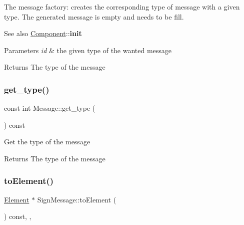 The message factory\+: creates the corresponding type of message with a given type. The generated message is empty and needs to be fill. \begin{DoxySeeAlso}{See also}
\mbox{\hyperlink{classComponent}{Component}}\+:\+:{\bfseries init}
\end{DoxySeeAlso}

\begin{DoxyParams}{Parameters}
{\em id} & the given type of the wanted message \\
\hline
\end{DoxyParams}
\begin{DoxyReturn}{Returns}
The type of the message 
\end{DoxyReturn}
\mbox{\label{classMessage_a2a576dcffd45c4574fcdf2897ec26086}} 
\subsubsection{\texorpdfstring{get\+\_\+type()}{get\_type()}}
{\footnotesize\ttfamily const int Message\+::get\+\_\+type (\begin{DoxyParamCaption}{ }\end{DoxyParamCaption}) const\hspace{0.3cm}{\ttfamily [inherited]}}

Get the type of the message

\begin{DoxyReturn}{Returns}
The type of the message 
\end{DoxyReturn}
\mbox{\label{classSignMessage_aee897c4bf78df966b8cca95e589566e4}} 
\subsubsection{\texorpdfstring{to\+Element()}{toElement()}}
{\footnotesize\ttfamily \mbox{\hyperlink{classElement}{Element}} $\ast$ Sign\+Message\+::to\+Element (\begin{DoxyParamCaption}{ }\end{DoxyParamCaption}) const\hspace{0.3cm}{\ttfamily [override]}, {\ttfamily [virtual]}, {\ttfamily [inherited]}}

